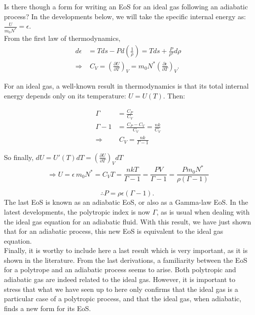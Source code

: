 \documentclass[12pt]{report}
\begin{document}
	Is there though a form for writing an EoS for an ideal gas following an adiabatic process? In the developments below, we will take the specific internal energy as: $\frac{U}{m_0N^*} = \epsilon$.\\
	
	From the first law of thermodynamics,
	\begin{align}
		d\epsilon &= Tds - Pd\left(\frac{1}{\rho}\right) = Tds + \frac{P}{\rho^2}d\rho\\
		\Rightarrow &\;C_V = \left(\frac{\partial U}{\partial T}\right)_V= m_0 N^*\left(\frac{\partial \epsilon}{\partial T}\right)_V.
	\end{align} 
	
	For an ideal gas, a well-known result in thermodynamics is that its total internal energy depends only on its temperature: $U = U(T)$.  Then:
	
	\begin{align}
		\Gamma &= \frac{C_P}{C_V} \\
		\Gamma-1 &= \frac{C_P-C_V}{C_V} = \frac{nk}{C_V} \\
		\Rightarrow &\; C_V = \frac{nk}{\Gamma-1}
	\end{align}
	
	So finally, $dU=U'(T)dT=\left(\frac{\partial U}{\partial T}\right)_VdT$
	\begin{equation}
		\Rightarrow U =  \epsilon \, m_0 N^* = C_VT = \frac{nkT}{\Gamma-1} = \frac{PV}{\Gamma-1}=\frac{Pm_0N^*}{\rho(\Gamma-1)} 
	\end{equation}
	
	\begin{equation}
		\therefore \boxed{P = \rho \epsilon(\Gamma-1).\;}\label{eq:adiab}
	\end{equation}
	The last EoS is known as an adiabatic EoS, or also as a Gamma-law EoS. In the latest developments, the polytropic index is now $\Gamma$, as is usual when dealing with the ideal gas equation for an adiabatic fluid. With this result, we have just shown that for an adiabatic process, this new EoS is equivalent to the ideal gas equation.\\
	
	Finally, it is worthy to include here a last result which is very important, as it is shown in the literature. From the last derivations, a familiarity between the EoS for a polytrope and an adiabatic process seems to arise. Both polytropic and adiabatic gas are indeed related to the ideal gas. However, it is important to stress that what we have seen up to here only confirms that the ideal gas is a particular case of a polytropic process, and that the ideal gas, when adiabatic, finds a new form for its EoS.\\
	
\end{document}
